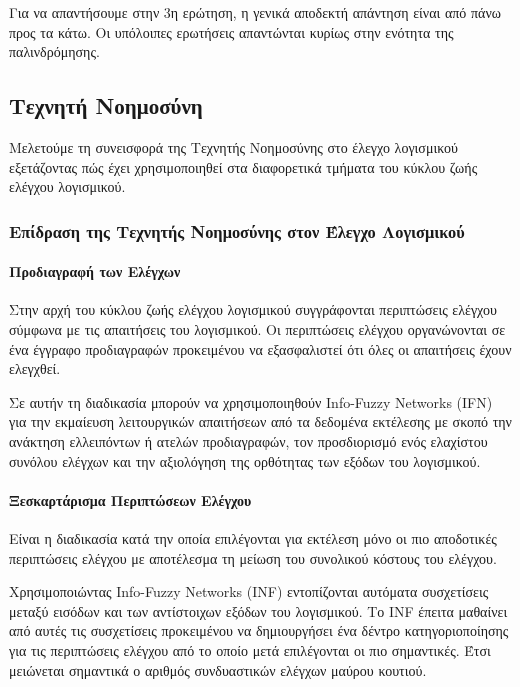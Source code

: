 \documentclass[12pt]{article}
\begin{document}
\par Για να απαντήσουμε στην 3η ερώτηση, η γενικά αποδεκτή απάντηση είναι από πάνω προς τα κάτω. Οι υπόλοιπες ερωτήσεις απαντώνται κυρίως στην ενότητα της παλινδρόμησης.

\subsection{Τεχνητή Νοημοσύνη}

\par Μελετούμε τη συνεισφορά της Τεχνητής Νοημοσύνης στο έλεγχο λογισμικού εξετάζοντας πώς έχει χρησιμοποιηθεί στα διαφορετικά τμήματα του κύκλου ζωής ελέγχου λογισμικού.

\subsubsection{Επίδραση της Τεχνητής Νοημοσύνης στον Έλεγχο Λογισμικού} 

\paragraph{Προδιαγραφή των Ελέγχων \cite{zubair}}
Στην αρχή του κύκλου ζωής ελέγχου λογισμικού συγγράφονται περιπτώσεις ελέγχου σύμφωνα με τις απαιτήσεις του λογισμικού. Οι περιπτώσεις ελέγχου οργανώνονται σε ένα έγγραφο προδιαγραφών προκειμένου να εξασφαλιστεί ότι όλες οι απαιτήσεις έχουν ελεγχθεί.
\par Σε αυτήν τη διαδικασία μπορούν να χρησιμοποιηθούν Info-Fuzzy Networks (IFN) για την εκμαίευση λειτουργικών απαιτήσεων από τα δεδομένα εκτέλεσης με σκοπό την ανάκτηση ελλειπόντων ή ατελών προδιαγραφών, τον προσδιορισμό ενός ελαχίστου συνόλου ελέγχων και την αξιολόγηση της ορθότητας των εξόδων του λογισμικού.

\paragraph{Ξεσκαρτάρισμα Περιπτώσεων Ελέγχου}
Είναι η διαδικασία κατά την οποία επιλέγονται για εκτέλεση μόνο οι πιο αποδοτικές περιπτώσεις ελέγχου με αποτέλεσμα τη μείωση του συνολικού κόστους του ελέγχου.
\par Χρησιμοποιώντας Info-Fuzzy Networks (INF) εντοπίζονται αυτόματα συσχετίσεις μεταξύ εισόδων και των αντίστοιχων εξόδων του λογισμικού. Το INF έπειτα μαθαίνει από αυτές τις συσχετίσεις προκειμένου να δημιουργήσει ένα δέντρο κατηγοριοποίησης για τις περιπτώσεις ελέγχου από το οποίο μετά επιλέγονται οι πιο σημαντικές. Έτσι μειώνεται σημαντικά ο αριθμός συνδυαστικών ελέγχων μαύρου κουτιού.
\end{document}

